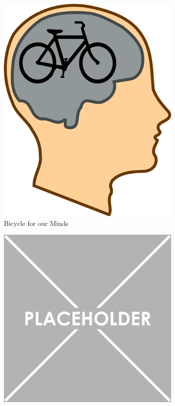\begin{landscape}
\begin{figure}
\begin{subfigure}[b]{0.3\textwidth}
    \includegraphics[width=\textwidth]{Bicycle-for-our-Minds}
    \caption{Bicycle for our Minds}
    \label{fig:Bicycle-for-our-Minds}
  \end{subfigure}             
  \begin{subfigure}[b]{0.3\textwidth}
    \includegraphics[width=\textwidth]{Placeholder}

\end{subfigure}
\end{figure}
\end{landscape}
